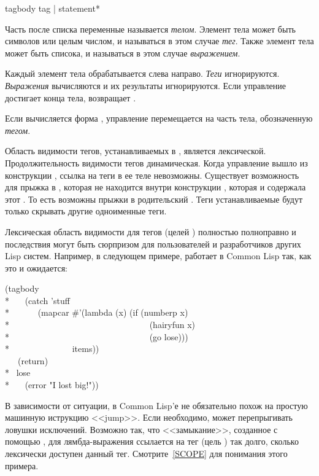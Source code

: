 \begin{defspec}
tagbody {tag | statement}*

Часть  после списка переменные называется \emph{телом}.
Элемент тела может быть символов или целым числом, и называться в этом случае
\emph{тег}. Также элемент тела может быть списока, и называться в этом случае
\emph{выражением}.

Каждый элемент тела обрабатывается слева направо.
\emph{Теги} игнорируются. \emph{Выражения} вычисляются и их результаты
игнорируются. Если управление достигает конца тела,  возвращает
{\false}.

Если вычисляется форма , управление перемещается на часть
тела, обозначенную \emph{тегом}.

Область видимости тегов, устанавливаемых в , является лексической. 
Продолжительность видимости тегов динамическая. Когда управление вышло из
конструкции , ссылка  на теги в ее теле невозможны.
Существует возможность для  прыжка в , которая не находится
внутри конструкции , которая и содержала этот . То есть
возможны прыжки в родительский .
Теги устанавливаемые  будут только скрывать другие одноименные
теги.

Лексическая область видимости для тегов (целей ) полностью полноправно и
последствия могут быть сюрпризом для пользователей и разработчиков других Lisp
систем.
Например,  в следующем примере, работает в Common Lisp так, как это и
ожидается:
\begin{lisp}
(tagbody \\*
~~~(catch 'stuff \\*
~~~~~~(mapcar \#'(lambda (x) (if (numberp x) \\*
~~~~~~~~~~~~~~~~~~~~~~~~~~~~~~~~(hairyfun x) \\*
~~~~~~~~~~~~~~~~~~~~~~~~~~~~~~~~(go lose))) \\*
~~~~~~~~~~~~~~items)) \\
~~~(return) \\*
~lose \\*
~~~(error "I lost big!"))
\end{lisp}
В зависимости от ситуации,  в Common Lisp'е не обязательно похож на
простую машинную иструкцию <<jump>>. Если необходимо,  может
перепрыгивать ловушки исключений. Возможно так, что <<замыкание>>, созданное с
помощью , для лямбда-выражения ссылается на тег (цель )
так долго, сколько лексически доступен данный тег. Смотрите~\ref{SCOPE} для
понимания этого примера.
\end{defspec}

